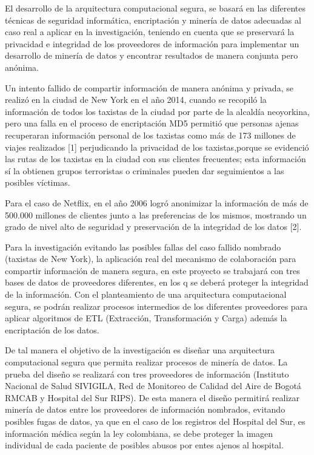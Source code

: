 \documentclass[a4paper, 11pt, oneside]{article}
\theoremstyle{definition}
\theoremstyle{remark}
\begin{document}
El desarrollo de la arquitectura computacional segura, se basará en las diferentes técnicas de seguridad informática, encriptación y minería de datos adecuadas al caso real a aplicar en la investigación, teniendo en cuenta que se preservará la privacidad e integridad de los proveedores de información para implementar un desarrollo de minería de datos y encontrar resultados de manera conjunta pero anónima.

Un intento fallido de compartir información de manera anónima y privada, se realizó en la ciudad de New York en el año 2014, cuando se recopiló la información de todos los taxistas de la ciudad por parte de la alcaldía neoyorkina, pero una falla en el proceso de encriptación MD5 permitió que personas ajenas recuperaran información personal de los taxistas como más de 173 millones de viajes realizados [1] perjudicando la privacidad de los taxistas,porque se evidenció las rutas de los taxistas en la ciudad con sus clientes frecuentes; esta información sí la obtienen grupos terroristas o criminales pueden dar seguimientos a las posibles víctimas.

Para el caso de Netflix, en el año 2006 logró anonimizar la información de más de 500.000 millones de clientes junto a las preferencias de los mismos, mostrando un grado de nivel alto de seguridad y preservación de la integridad de los datos [2].

Para la investigación evitando las posibles fallas del caso fallido nombrado (taxistas de New York), la aplicación real del mecanismo de colaboración para compartir información de manera segura, en este proyecto se trabajará con tres bases de datos de proveedores diferentes, en los q se deberá proteger la integridad de la información. Con el planteamiento de una arquitectura computacional segura, se podrán realizar procesos intermedios de los diferentes proveedores para aplicar algoritmos de ETL (Extracción, Transformación y Carga) además la encriptación de los datos. 

De tal manera el objetivo de la investigación es diseñar una arquitectura computacional segura que permita realizar procesos de minería de datos. La prueba del diseño se realizará con tres proveedores de información (Instituto Nacional de Salud SIVIGILA, Red de Monitoreo de Calidad del Aire de Bogotá RMCAB y Hospital del Sur RIPS). De esta manera el diseño permitirá realizar minería de datos entre los proveedores de información nombrados, evitando posibles fugas de datos, ya que en el caso de los registros del Hospital del Sur, es información médica según la ley colombiana, se debe proteger la imagen individual de cada paciente de posibles abusos por entes ajenos al hospital.
\end{document}
